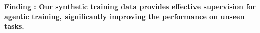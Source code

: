 
\begin{shaded}
\noindent \textbf{Finding \findingnum: 
Our synthetic training data provides effective supervision for agentic training, significantly improving the performance on unseen tasks.
}
\end{shaded}